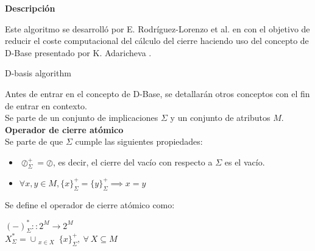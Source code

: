 \textbf{Descripci\'on} 


Este algoritmo se desarroll\'o por E. Rodr\'iguez-Lorenzo et al. en \cite{DBasis} con el objetivo  de reducir el coste computacional del c\'alculo del cierre haciendo uso del concepto de D-Base presentado por K. Adaricheva \cite{Adaricheva}.\\

\IncMargin{1em}
\begin{algorithm}[H]
    \SetAlgoLined
    \DontPrintSemicolon
    \caption{D-basis algorithm}\label{alg:7}
\end{algorithm}\DecMargin{1em}
\bigskip

Antes de entrar en el concepto de D-Base, se detallar\'an otros conceptos con el fin de entrar en contexto.\\

Se parte de un conjunto de implicaciones \( \Sigma \) y un conjunto de atributos \( M \).\\

\textbf{Operador de cierre at\'omico}\\
Se parte de que \(\Sigma\) cumple las siguientes propiedades:
\begin{itemize}
    \item \(\oslash^+_{\Sigma} = \oslash\), es decir, el cierre del vac\'io con respecto a \(\Sigma\) es el vac\'io.
    \item \(\forall x,y \in M, \{x\}^+_{\Sigma} = \{y\}^+_{\Sigma} \implies x = y\)
\end{itemize}
Se define el operador de cierre at\'omico como: 
\begin{center}
    \((-)^*_{\Sigma}::2^M \to 2^M \) \\
    \(X^*_{\Sigma} = \cup_{\substack{x \in X}} \{x\}^+_{\Sigma}, \ \forall \ X \subseteq M \)
\end{center}


